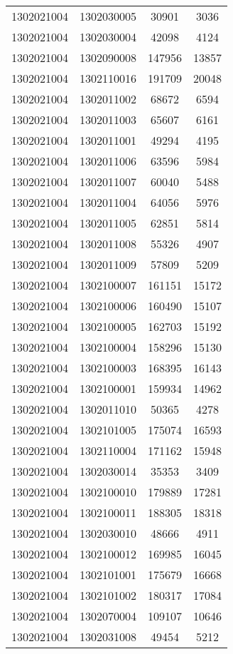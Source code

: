 \begin{longtable}[h]{llcc}
		1302021004 & 1302030005 & 30901 & 3036\\
		1302021004 & 1302030004 & 42098 & 4124\\
		1302021004 & 1302090008 & 147956 & 13857\\
		1302021004 & 1302110016 & 191709 & 20048\\
		1302021004 & 1302011002 & 68672 & 6594\\
		1302021004 & 1302011003 & 65607 & 6161\\
		1302021004 & 1302011001 & 49294 & 4195\\
		1302021004 & 1302011006 & 63596 & 5984\\
		1302021004 & 1302011007 & 60040 & 5488\\
		1302021004 & 1302011004 & 64056 & 5976\\
		1302021004 & 1302011005 & 62851 & 5814\\
		1302021004 & 1302011008 & 55326 & 4907\\
		1302021004 & 1302011009 & 57809 & 5209\\
		1302021004 & 1302100007 & 161151 & 15172\\
		1302021004 & 1302100006 & 160490 & 15107\\
		1302021004 & 1302100005 & 162703 & 15192\\
		1302021004 & 1302100004 & 158296 & 15130\\
		1302021004 & 1302100003 & 168395 & 16143\\
		1302021004 & 1302100001 & 159934 & 14962\\
		1302021004 & 1302011010 & 50365 & 4278\\
		1302021004 & 1302101005 & 175074 & 16593\\
		1302021004 & 1302110004 & 171162 & 15948\\
		1302021004 & 1302030014 & 35353 & 3409\\
		1302021004 & 1302100010 & 179889 & 17281\\
		1302021004 & 1302100011 & 188305 & 18318\\
		1302021004 & 1302030010 & 48666 & 4911\\
		1302021004 & 1302100012 & 169985 & 16045\\
		1302021004 & 1302101001 & 175679 & 16668\\
		1302021004 & 1302101002 & 180317 & 17084\\
		1302021004 & 1302070004 & 109107 & 10646\\
		1302021004 & 1302031008 & 49454 & 5212\\

\end{longtable}
